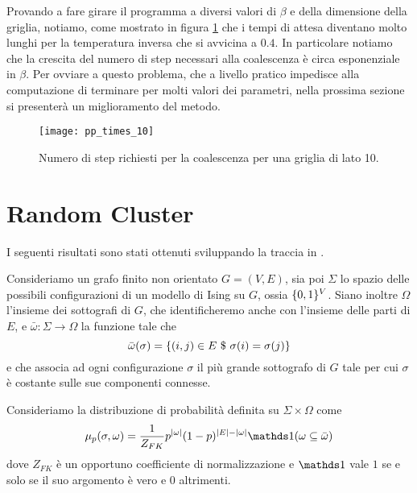 \documentclass[]{marticle}
\begin{document}
Provando a fare girare il programma a diversi valori di $\beta$ e della
dimensione della griglia, notiamo, come mostrato in figura \ref{fig:plot1} che i
tempi di attesa diventano molto lunghi per la temperatura inversa che si
avvicina a $0.4$. In particolare notiamo che la crescita del numero di step
necessari alla coalescenza \`e circa esponenziale in $\beta$. Per ovviare a
questo problema, che a livello pratico impedisce alla computazione di terminare
per molti valori dei parametri, nella prossima sezione si presenter\`a un
miglioramento del metodo.

\begin{figure}[h!]
\caption{Numero di step richiesti per la coalescenza per una griglia di lato 10.}
\texttt{[image: pp\_times\_10]}
\label{fig:plot1}
\centering
\end{figure}

\section{Random Cluster}
I seguenti risultati sono stati ottenuti sviluppando la traccia in
\cite{edwards-sokal}.

Consideriamo un grafo finito non orientato $G=(V,E)$, sia poi $\Sigma$ lo spazio
delle possibili configurazioni di un modello di Ising su $G$, ossia
$\{0,1\}^V$.  Siano inoltre $\Omega$ l'insieme dei sottografi di $G$, che
identificheremo anche con l'insieme delle parti di $E$, e $\bar{\omega}\colon
\Sigma \longrightarrow \Omega$ la funzione tale che 
\[
    \bar{\omega}(\sigma) = \{(i,j)\in E \ \$\  \sigma(i) = \sigma(j)\}
\]
e che associa ad ogni configurazione $\sigma$ il pi\`u grande sottografo di $G$
tale per cui $\sigma$ \`e costante sulle sue componenti connesse.

Consideriamo la distribuzione di probabilit\`a definita su $\Sigma \times
\Omega$ come
\[
    \mu_p(\sigma, \omega) = \frac{1}{Z_{FK}} p^{|\omega|} (1-p)^{|E| - |\omega|}
    \ind(\omega \subseteq \bar{\omega})
\]
dove $Z_{FK}$ \`e un opportuno coefficiente di normalizzazione e $\ind$ vale $1$ se
e solo se il suo argomento \`e vero e $0$ altrimenti.
\end{document}
